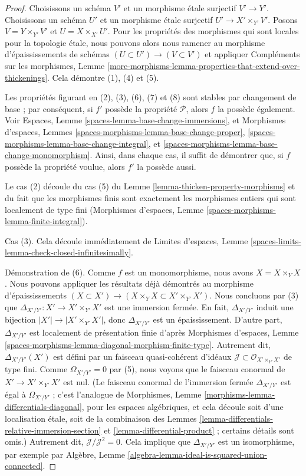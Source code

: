 \begin{proof}
Choisissons un schéma $V'$ et un morphisme étale surjectif $V' \to Y'$.
Choisissons un schéma $U'$ et un morphisme étale surjectif
$U' \to X' \times_{Y'} V'$. Posons $V = Y \times_{Y'} V'$ et
$U = X \times_{X'} U'$. Pour les propriétés des morphismes qui sont locales
pour la topologie étale, nous pouvons alors nous ramener au morphisme d'épaississements de schémas
$(U \subset U') \to (V \subset V')$ et appliquer
Compléments sur les morphismes, Lemme
\ref{more-morphisms-lemma-properties-that-extend-over-thickenings}.
Cela démontre (1), (4) et (5).

\medskip\noindent
Les propriétés figurant en (2), (3), (6), (7) et (8) sont stables
par changement de base ; par conséquent, si $f'$ possède la propriété $\mathcal{P}$, alors
$f$ la possède également. Voir Espaces, Lemme \ref{spaces-lemma-base-change-immersions},
et
Morphismes d'espaces, Lemmes
\ref{spaces-morphisms-lemma-base-change-proper},
\ref{spaces-morphisms-lemma-base-change-integral}, et
\ref{spaces-morphisms-lemma-base-change-monomorphism}.
Ainsi, dans chaque cas, il suffit de démontrer que, si $f$ possède
la propriété voulue, alors $f'$ la possède aussi.

\medskip\noindent
Le cas (2) découle du cas (5) du Lemme \ref{lemma-thicken-property-morphisms}
et du fait que les morphismes finis sont exactement
les morphismes entiers qui sont localement de type fini
(Morphismes d'espaces, Lemme \ref{spaces-morphisms-lemma-finite-integral}).

\medskip\noindent
Cas (3). Cela découle immédiatement de
Limites d'espaces, Lemme
\ref{spaces-limits-lemma-check-closed-infinitesimally}.

\medskip\noindent
Démonstration de (6). Comme $f$ est un monomorphisme, nous avons $X = X \times_Y X$.
Nous pouvons appliquer les résultats déjà démontrés au morphisme d'épaississements
$(X \subset X') \to (X \times_Y X \subset X' \times_{Y'} X')$.
Nous concluons par (3) que $\Delta_{X'/Y'} : X' \to X' \times_{Y'} X'$
est une immersion fermée. En fait, $\Delta_{X'/Y'}$ induit une bijection
$|X'| \to |X' \times_{Y'} X'|$, donc $\Delta_{X'/Y'}$ est un épaississement.
D'autre part, $\Delta_{X'/Y'}$ est localement de présentation finie d'après
Morphismes d'espaces, Lemme
\ref{spaces-morphisms-lemma-diagonal-morphism-finite-type}.
Autrement dit, $\Delta_{X'/Y'}(X')$ est défini par
un faisceau quasi-cohérent d'idéaux
$\mathcal{J} \subset \mathcal{O}_{X' \times_{Y'} X'}$ de type fini.
Comme $\Omega_{X'/Y'} = 0$ par (5), nous voyons que
le faisceau conormal de $X' \to X' \times_{Y'} X'$ est nul.
(Le faisceau conormal de l'immersion fermée $\Delta_{X'/Y'}$ est égal à
$\Omega_{X'/Y'}$ ; c'est l'analogue de
Morphismes, Lemme \ref{morphisms-lemma-differentials-diagonal},
pour les espaces algébriques, et cela découle soit d'une localisation étale,
soit de la combinaison des
Lemmes \ref{lemma-differentials-relative-immersion-section} et
\ref{lemma-differential-product} ; certains détails sont omis.)
Autrement dit, $\mathcal{J}/\mathcal{J}^2 = 0$.
Cela implique que $\Delta_{X'/Y'}$ est un isomorphisme, par exemple
par Algèbre, Lemme \ref{algebra-lemma-ideal-is-squared-union-connected}.


\end{proof}
